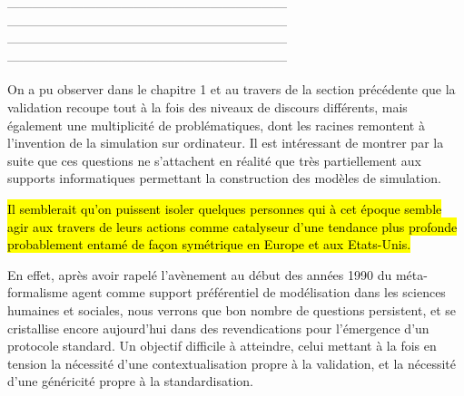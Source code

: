 

------------------------------------------------------------------
------------------------------------------------------------------
------------------------------------------------------------------
------------------------------------------------------------------


On a pu observer dans le chapitre 1 et au travers de la section précédente que la validation recoupe tout à la fois des niveaux de discours différents, mais également une multiplicité de problématiques, dont les racines remontent à l'invention de la simulation sur ordinateur. Il est intéressant de montrer par la suite que ces questions ne s'attachent en réalité que très partiellement aux supports informatiques permettant la construction des modèles de simulation. 

\hl{Il semblerait qu'on puissent isoler quelques personnes qui à cet époque semble agir aux travers de leurs actions comme catalyseur d'une tendance plus profonde probablement entamé de façon symétrique en Europe et aux Etats-Unis.}


En effet, après avoir rapelé l’avènement au début des années 1990 du méta-formalisme agent comme support préférentiel de modélisation dans les sciences humaines et sociales, nous verrons que bon nombre de questions persistent, et se cristallise encore aujourd'hui dans des revendications pour l'émergence d'un protocole standard. Un objectif difficile à atteindre, celui mettant à la fois en tension la nécessité d'une contextualisation propre à la validation, et la nécessité d'une généricité propre à la standardisation.


